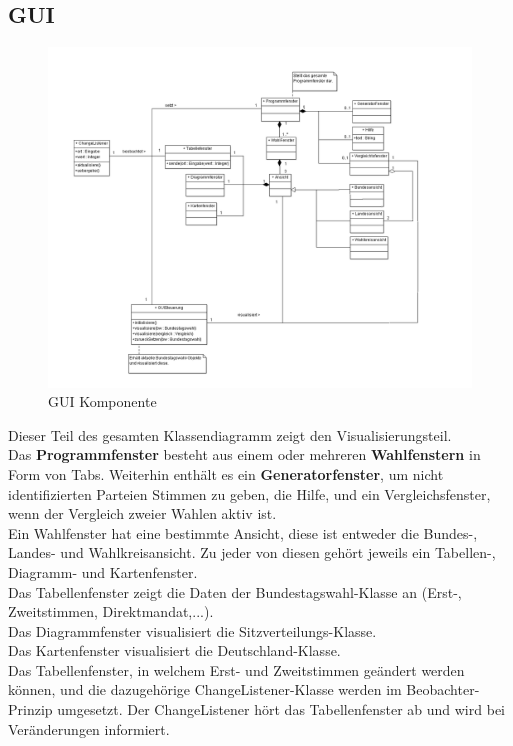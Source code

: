 \documentclass[12pt,a4paper,titlepage]{article}
\newcommand{\myma}{\fontfamily{pcr}\selectfont \textbf}
\begin{document}
\subsection{GUI}
\begin{figure}[!ht]
\includegraphics[scale=0.4]{GUI-Abschnitt.png} \caption{GUI Komponente} 
\end{figure}
Dieser Teil des gesamten Klassendiagramm zeigt den Visualisierungsteil. \\
Das {\myma{Programmfenster}} besteht aus einem oder mehreren {\myma{Wahlfenstern}} in Form von Tabs. Weiterhin enthält es
ein {\myma{Generatorfenster}}, um nicht identifizierten Parteien Stimmen zu geben, die Hilfe, und
ein Vergleichsfenster, wenn der Vergleich zweier Wahlen aktiv ist. \\
Ein Wahlfenster hat eine bestimmte Ansicht, diese ist entweder die Bundes-, Landes- und
Wahlkreisansicht. Zu jeder von diesen gehört jeweils ein Tabellen-, Diagramm- und Kartenfenster. \\
Das Tabellenfenster zeigt die Daten der Bundestagswahl-Klasse an (Erst-, Zweitstimmen, Direktmandat,...).\\
Das Diagrammfenster visualisiert die Sitzverteilungs-Klasse. \\
Das Kartenfenster visualisiert die Deutschland-Klasse. \\
Das Tabellenfenster, in welchem Erst- und Zweitstimmen geändert werden können, und die
dazugehörige ChangeListener-Klasse werden im Beobachter-Prinzip umgesetzt. Der ChangeListener
hört das Tabellenfenster ab und wird bei Veränderungen informiert. \\
\end{document}
